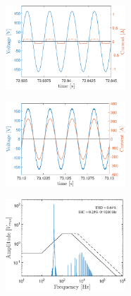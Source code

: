 \begin{figure}[!b] %
	\centering
	\includegraphics[width=0.4\textwidth]{Figures/artigo_unfilt_4.eps}
	\caption{}
	\label{fig:artigo_unfilt_4.eps}
\end{figure}

\begin{figure}[!b] %
	\centering
	\includegraphics[width=0.4\textwidth]{Figures/artigo_filt_3.eps}
	\caption{}
	\label{fig:artigo_filt_3.eps}
\end{figure}

\begin{figure}[!b] %
	\centering
	\includegraphics[width=0.4\textwidth]{Figures/artigo_filt_4.eps}
	\caption{}
	\label{fig:artigo_filt_4.eps}
\end{figure}
